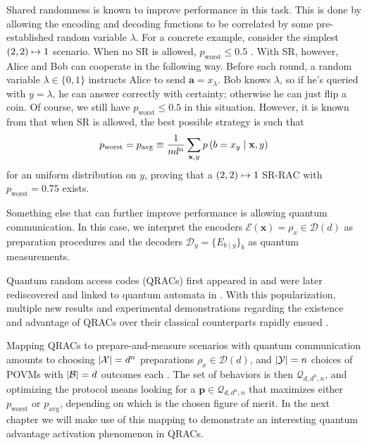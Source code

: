            Shared randomness is known to improve performance in this task. This is done by allowing the encoding and decoding functions to be correlated by some pre-established random variable $\lambda$. For a concrete example, consider the simplest $\left( 2, 2 \right) \mapsto 1$ scenario. When no SR is allowed, $p_{\text{worst}} \leq 0.5$ \cite{ambainis_qracsoriginal_1999}. With SR, however, Alice and Bob can cooperate in the following way. Before each round, a random variable $\lambda \in \{0, 1\}$ instructs Alice to send $\mathbf{a} = x_\lambda$. Bob knows $\lambda$, so if he's queried with $y = \lambda$, he can answer correctly with certainty; otherwise he can just flip a coin. Of course, we still have $p_{\text{worst}} \leq 0.5$ in this situation. However, it is known from \cite{ambainis_srqracs_2009} that when SR is allowed, the best possible strategy is such that 
            \begin{equation}
                p_{\text{worst}} = p_{\text{avg}} \equiv \frac{1}{nd^n} \sum_{\mathbf{x},y} p \left( b=x_y \mid \mathbf{x},y \right)
                \label{eq:rac-p-avg}
            \end{equation}
            for an uniform distribution on $y$, proving that a $\left( 2, 2 \right) \mapsto 1$ SR-RAC with $p_{\text{worst}} = 0.75$ exists.

            Something else that can further improve performance is allowing quantum communication. In this case, we interpret the encoders $\mathcal{E}(\mathbf{x}) = \rho_x \in \mathcal{D}(d)$ as preparation procedures and the decoders $\mathcal{D}_y = \{ E_{b \mid y} \}_b$ as quantum measurements.

            Quantum random access codes (QRACs) first appeared in \cite{wiesner1983conjugate} and were later rediscovered and linked to quantum automata in \cite{ambainis_qracsoriginal_1999}. With this popularization, multiple new results and experimental demonstrations regarding the existence and advantage of QRACs over their classical counterparts rapidly ensued \cite{nayak1999optimal,ambainis2002dense,hayashi_41qracs_2006,ambainis_srqracs_2009,spekkens2009preparation,pawlowski_pamqkd_2011}.

            Mapping QRACs to prepare-and-measure scenarios with quantum communication amounts to choosing $\abs{\mathcal{X}} = d^n$ preparations $\rho_{x} \in \mathcal{D}(d)$, and $\abs{\mathcal{Y}} = n$  choices of POVMs with $\abs{\mathcal{B}} = d$ outcomes each \cite{de_vicente_bound_2019}. The set of behaviors is then $\mathcal{Q}_{d,d^n,n}$, and optimizing the protocol means looking for a $\mathbf{p} \in \mathcal{Q}_{d,d^n,n}$ that maximizes either $p_{\text{worst}}$ or $p_{\text{avg}}$, depending on which is the chosen figure of merit. In the next chapter we will make use of this mapping to demonstrate an interesting quantum advantage activation phenomenon in QRACs.

